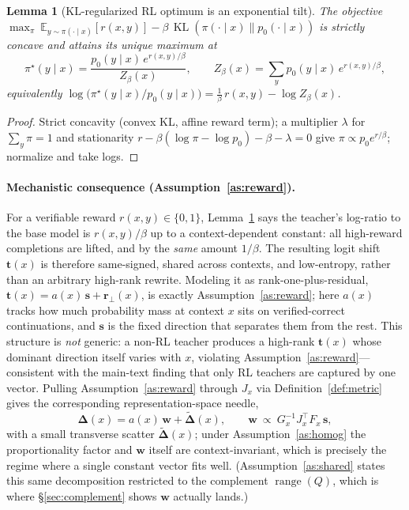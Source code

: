 \documentclass[11pt]{article}
\newtheorem{lemma}{Lemma}[section]
\DeclareMathOperator{\KL}{KL}
\newcommand{\E}{\mathbb{E}}
\newcommand{\bt}{\mathbf{t}}
\newcommand{\bs}{\mathbf{s}}
\newcommand{\bw}{\mathbf{w}}
\newcommand{\br}{\mathbf{r}}
\newcommand{\bDelta}{\bm{\Delta}}
\begin{document}
\begin{lemma}[KL-regularized RL optimum is an exponential tilt]\label{lem:tilt}
The objective
$\max_{\pi}\ \E_{y\sim\pi(\cdot\mid x)}[r(x,y)]-\beta\,\KL(\pi(\cdot\mid x)\|p_0(\cdot\mid x))$
is strictly concave and attains its unique maximum at
\begin{equation}\label{eq:pistar}
\pi^\star(y\mid x)=\frac{p_0(y\mid x)\,e^{r(x,y)/\beta}}{Z_\beta(x)},
\qquad
Z_\beta(x)=\sum_{y}p_0(y\mid x)\,e^{r(x,y)/\beta},
\end{equation}
equivalently $\log\big(\pi^\star(y\mid x)/p_0(y\mid x)\big)=\tfrac1\beta\,r(x,y)-\log Z_\beta(x)$.
\end{lemma}
\begin{proof}
Strict concavity (convex KL, affine reward term); a multiplier $\lambda$ for $\sum_y\pi=1$ and
stationarity $r-\beta(\log\pi-\log p_0)-\beta-\lambda=0$ give $\pi\propto p_0 e^{r/\beta}$;
normalize and take logs.
\end{proof}

\paragraph{Mechanistic consequence (Assumption~\ref{as:reward}).}
For a verifiable reward $r(x,y)\in\{0,1\}$, Lemma~\ref{lem:tilt} says the teacher's log-ratio to the
base model is $r(x,y)/\beta$ up to a context-dependent constant: all high-reward completions are
lifted, and by the \emph{same} amount $1/\beta$. The resulting logit shift $\bt(x)$ is therefore
same-signed, shared across contexts, and low-entropy, rather than an arbitrary high-rank rewrite.
Modeling it as rank-one-plus-residual, $\bt(x)=a(x)\,\bs+\br_\perp(x)$, is exactly
Assumption~\ref{as:reward}; here $a(x)$ tracks how much probability mass at context $x$ sits on
verified-correct continuations, and $\bs$ is the fixed direction that separates them from the rest.
This structure is \emph{not} generic: a non-RL teacher produces a high-rank $\bt(x)$ whose dominant
direction itself varies with $x$, violating Assumption~\ref{as:reward}---consistent with the
main-text finding that only RL teachers are captured by one vector. Pulling
Assumption~\ref{as:reward} through $J_x$ via Definition~\ref{def:metric} gives the corresponding
representation-space needle,
\begin{equation*}
\bDelta(x)=a(x)\,\bw+\tilde{\bDelta}(x),
\qquad
\bw\ \propto\ G_x^{-1}J_x^\top F_x\,\bs ,
\end{equation*}
with a small transverse scatter $\tilde{\bDelta}(x)$; under Assumption~\ref{as:homog} the
proportionality factor and $\bw$ itself are context-invariant, which is precisely the regime where a
single constant vector fits well. (Assumption~\ref{as:shared} states this same decomposition
restricted to the complement $\operatorname{range}(Q)$, which is where \S\ref{sec:complement} shows
$\bw$ actually lands.)
\end{document}
